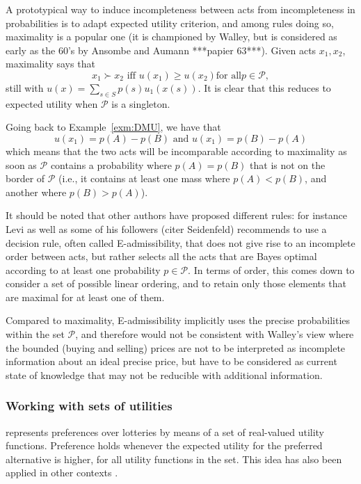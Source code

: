 \documentclass[french, english]{llncs}
\begin{document}
	A prototypical way to induce incompleteness between acts from incompleteness in probabilities is to adapt expected utility criterion, and among rules doing so, maximality is a popular one (it is championed by Walley, but is considered as early as the 60's by Ansombe and Aumann ***papier 63***). Given acts $x_1,x_2$, maximality says that 
	$$x_1 \succ x_2 \textrm{ iff }  u(x_1) ≥ u(x_2) \textrm{for all} p \in \mathcal{P},$$
	still with $u(x) = \sum_{s \in S} p(s) u_1(x(s))$. It is clear that this reduces to expected utility when $\mathcal{P}$	is a singleton. 
	
	\begin{example}
		Going back to Example~\ref{exm:DMU}, we have that 
		$$u(x_1)=p(A) - p(B) \textrm{ and } u(x_1)=p(B) - p(A)$$
		which means that the two acts will be incomparable according to maximality as soon as $\mathcal{P}$ contains a probability where $p(A)=p(B)$ that is not on the border of $\mathcal{P}$ (i.e., it contains at least one mass where $p(A)<p(B)$, and another where $p(B)>p(A)$). 
	\end{example}
	
	It should be noted that other authors have proposed different rules: for instance Levi as well as some of his followers (citer Seidenfeld) recommends to use a decision rule, often called E-admissibility, that does not give rise to an incomplete order between acts, but rather selects all the acts that are Bayes optimal according to at least one probability $p \in \mathcal{P}$. In terms of order, this comes down to consider a set of possible linear ordering, and to retain only those elements that are maximal for at least one of them. 
	
	Compared to maximality, E-admissibility implicitly uses the precise probabilities within the set $\mathcal{P}$, and therefore would not be consistent with Walley's view where the bounded (buying and selling) prices are not to be interpreted as incomplete information about an ideal precise price, but have to be considered as current state of knowledge that may not be reducible with additional information. 
	
	\subsubsection{Working with sets of utilities}
	
	\citet{dubra_expected_2004} represents preferences over lotteries by means of a set of real-valued utility functions. Preference holds whenever the expected utility for the preferred alternative is higher, for all utility functions in the set. This idea has also been applied in other contexts \citep{ok_utility_2002, eliaz_indifference_2006}.
	
\end{document}
